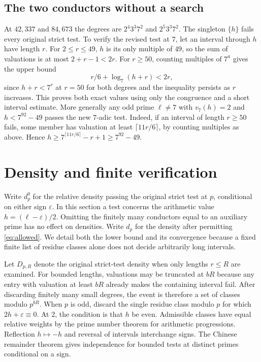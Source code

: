 \documentclass[11pt]{article}
\begin{document}
\subsection*{The two conductors without a search}
At $42{,}337$ and $84{,}673$ the degrees are $2^4 3^3 7^2$ and $2^5 3^3 7^2$. The singleton $\{h\}$ fails every original strict test. To verify the revised test at $7$, let an interval through $h$ have length $r$. For $2\le r\le49$, $h$ is its only multiple of $49$, so the sum of valuations is at most $2+r-1<2r$. For $r\ge50$, counting multiples of $7^a$ gives the upper bound
\[
 r/6+\log_7(h+r)<2r,
\]
since $h+r<7^r$ at $r=50$ for both degrees and the inequality persists as $r$ increases. This proves both exact values using only the congruence and a short interval estimate.
More generally any odd prime $\ell\ne7$ with $v_7(h)=2$ and $h<7^{92}-49$ passes the new $7$-adic test. Indeed, if an interval of length $r\ge50$ fails, some member has valuation at least $\lceil 11r/6\rceil$, by counting multiples as above. Hence $h\ge7^{\lceil11r/6\rceil}-r+1\ge7^{92}-49$.

\section{Density and finite verification}
Write $d^0_p$ for the relative density passing the original strict test at $p$, conditional on either sign $\varepsilon$. In this section a test concerns the arithmetic value $h=(\ell-\varepsilon)/2$. Omitting the finitely many conductors equal to an auxiliary prime has no effect on densities. Write $d_p$ for the density after permitting \eqref{eq:allowed}. We detail both the lower bound and its convergence because a fixed finite list of residue classes alone does not decide arbitrarily long intervals.

Let $D_{p,R}$ denote the original strict-test density when only lengths $r\le R$ are examined. For bounded lengths, valuations may be truncated at $bR$ because any entry with valuation at least $bR$ already makes the containing interval fail. After discarding finitely many small degrees, the event is therefore a set of classes modulo $p^{bR}$. When $p$ is odd, discard the single residue class modulo $p$ for which $2h+\varepsilon\equiv0$. At $2$, the condition is that $h$ be even. Admissible classes have equal relative weights by the prime number theorem for arithmetic progressions. Reflection $h\mapsto-h$ and reversal of intervals interchange signs. The Chinese remainder theorem gives independence for bounded tests at distinct primes conditional on a sign.
\end{document}
